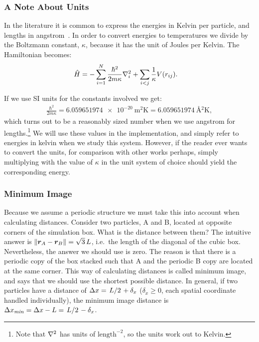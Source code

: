\documentclass[Thesis.tex]{subfiles}
\begin{document}
\subsubsection{A Note About Units}

In the literature it is common to express the energies in Kelvin per particle,
and lengths in angstrom~\cite{Kalos-1981, Aziz-hfdhe2, ruggeri2018}. In order to convert energies to temperatures we
divide by the Boltzmann constant, $\kappa$, because it has the unit of Joules per
Kelvin. The Hamiltonian becomes:
\begin{align}
  \hat H &= -\sum_{i=1}^N \frac{\hbar^2}{2m\kappa}\laplacian_i + \sum_{i<j}\frac{1}{\kappa}V(r_{ij}).
\end{align}

If we use SI units for the constants involved we get:
\begin{align}
  \frac{\hbar^2}{2m\kappa} = \SI{6.059651974e-20}{\metre^2\kelvin} = \SI{6.059651974}{\angstrom^2\kelvin},
\end{align}
which turns out to be a reasonably sized number when we use angstrom for
lengths.\footnote{Note that $\laplacian$ has units of $\text{length}^{-2}$, so
  the units work out to Kelvin.} We will use these values in the implementation,
and simply refer to energies in kelvin when we study this system. However, if
the reader ever wants to convert the units, for comparison with other works
perhaps, simply multiplying with the value of $\kappa$ in the unit system of
choice should yield the corresponding energy.


\subsubsection{Minimum Image}

Because we assume a periodic structure we must take this into account when
calculating distances. Consider two particles, A and B, located at opposite
corners of the simulation box. What is the distance between them? The intuitive
answer is $\norm{\bm{r}_A - \bm{r}_B} = \sqrt{3}\,L$, i.e.\ the length of the
diagonal of the cubic box. Nevertheless, the answer we should use is zero. The
reason is that there is a periodic copy of the box stacked such that A and the
periodic B copy are located at the same corner. This way of calculating
distances is called minimum image, and says that we should use the shortest
possible distance. In general, if two particles have a distance of $\Delta x =
\flatfrac{L}{2} + \delta_x$ ($\delta_x\geq 0$, each spatial coordinate handled
individually), the minimum image distance is $\Delta x_{\mathit{min}} = \Delta x
- L = \flatfrac{L}{2} - \delta_x$.
\end{document}
